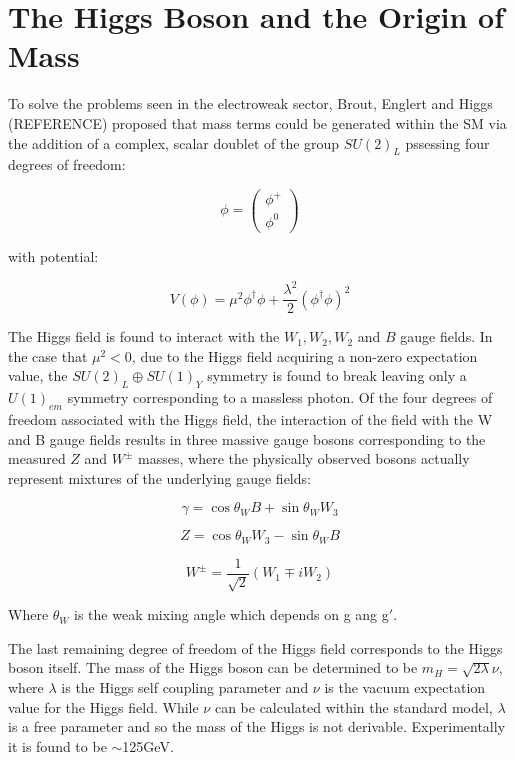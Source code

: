 \section{The Higgs Boson and the Origin of Mass}

To solve the problems seen in the electroweak sector, Brout, Englert and Higgs (REFERENCE) proposed that mass terms could be generated within the \ac{SM} via the addition of a complex, scalar doublet of the group $SU(2)_{L}$ pssessing four degrees of freedom:

\begin{equation}
\phi = \begin{pmatrix} \phi^{+} \\ \phi^{0} \end{pmatrix} 
\end{equation}

with potential:

\begin{equation}
V(\phi) = \mu^{2}\phi^{\dagger}\phi + \frac{\lambda^{2}}{2}(\phi^{\dagger}\phi)^{2}
\end{equation}

The Higgs field is found to interact with the $W_{1},W_{2},W_{2}$ and $B$ gauge fields. In the case that $\mu^{2}<0$, due to the Higgs field acquiring a non-zero expectation value, the $SU(2)_{L}\oplus SU(1)_{Y}$ symmetry is found to break leaving only a $U(1)_{em}$ symmetry corresponding to a massless photon. Of the four degrees of freedom associated with the Higgs field, the interaction of the field with the W and B gauge fields results in three massive gauge bosons corresponding to the measured $Z$ and $W^{\pm}$ masses, where the physically observed bosons actually represent mixtures of the underlying gauge fields:

\begin{equation}
\gamma = \cos\theta_{W}B  +\sin\theta_{W}W_{3} 
\end{equation}

\begin{equation}
Z = \cos\theta_{W}W_{3}  -\sin\theta_{W}B
\end{equation}

\begin{equation}
W^{\pm}= \frac{1}{\sqrt{2}}(W_{1}\mp iW_{2})
\end{equation}

Where $\theta_{W}$ is the weak mixing angle which depends on g ang g$'$.

The last remaining degree of freedom of the Higgs field corresponds to the Higgs boson itself. The mass of the Higgs boson can be determined to be $m_{H}=\sqrt{2\lambda}\nu$, where $\lambda$ is the Higgs self coupling parameter and $\nu$ is the vacuum expectation value for the Higgs field. While $\nu$ can be calculated within the standard model, $\lambda$ is a free parameter and so the mass of the Higgs is not derivable. Experimentally it is found to be $\sim$125GeV.

